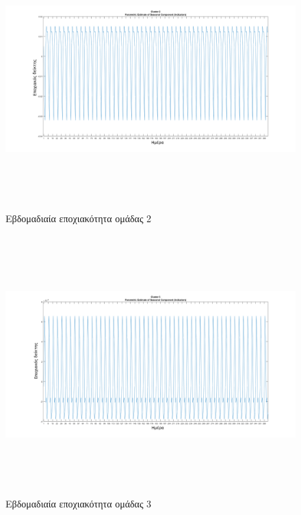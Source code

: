 \begin{figure}[ht!]
\centering
\includegraphics[width=180mm, height=100mm]{../../plots/Trend_estimation/seasonal_2.png}
\caption{Εβδομαδιαία εποχιακότητα ομάδας 2}
\label{fig:season 2}
\end{figure}
\begin{figure}[ht!]
\centering
\includegraphics[width=180mm, height=100mm]{../../plots/Trend_estimation/seasonal_3.png}
\caption{Εβδομαδιαία εποχιακότητα ομάδας 3}
\label{fig:season 3}
\end{figure}
